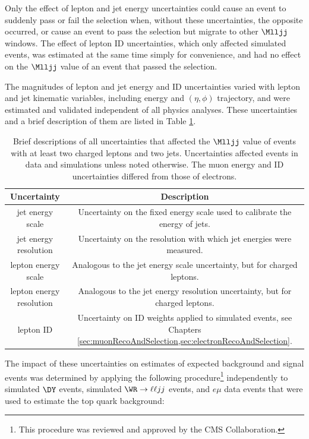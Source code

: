 Only the effect of lepton and jet energy uncertainties could cause an event to suddenly pass or fail 
the selection when, without these uncertainties, the opposite occurred, or cause an event to pass the 
selection but migrate to other $\Mlljj$ windows.  The effect of lepton ID uncertainties, which 
only affected simulated events, was estimated at the same time simply for convenience, and had no 
effect on the $\Mlljj$ value of an event that passed the selection.

The magnitudes of lepton and jet energy and ID uncertainties varied with lepton and jet kinematic variables, 
including energy and $(\eta,\phi)$ trajectory, and were estimated and validated independent of all physics 
analyses.  These uncertainties and a brief description of them are listed in Table \ref{tab:energyAndIdUncertainties}.

\begin{table}[ht]
	\caption{Brief descriptions of all uncertainties that affected the $\Mlljj$ value of events with at 
	least two charged leptons and two jets.  Uncertainties affected events in data and simulations 
unless noted otherwise.  The muon energy and ID uncertainties differed from those of electrons.}
  \label{tab:energyAndIdUncertainties}
  \centering
    \begin{tabular}{c|c}
		Uncertainty & Description                               \\
      \hline
	  jet energy scale & Uncertainty on the fixed energy scale used to calibrate the energy of jets. \\
 jet energy resolution & Uncertainty on the resolution with which jet energies were measured. \\
   lepton energy scale & Analogous to the jet energy scale uncertainty, but for charged leptons. \\
 lepton energy resolution & Analogous to the jet energy resolution uncertainty, but for charged leptons. \\
lepton ID & Uncertainty on ID weights applied to simulated events, see Chapters \ref{sec:muonRecoAndSelection,sec:electronRecoAndSelection}. \\
  \hline
  \end{tabular}
\end{table}

The impact of these uncertainties on estimates of expected background and signal events was 
determined by applying the following procedure\footnote{This procedure was reviewed and approved by the CMS Collaboration.} 
independently to simulated $\DY$ events, simulated $\WR \rightarrow \ell\ell jj$ events, and 
$e\mu$ data events that were used to estimate the top quark background:

